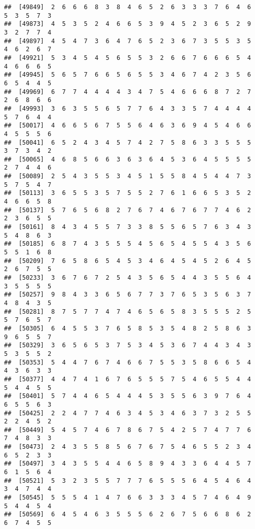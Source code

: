 \documentclass[
]{book}
\begin{document}
\begin{verbatim}
##  [49849]  2  6  6  6  8  3  8  4  6  5  2  6  3  3  3  7  6  4  6  5  3  5  7  3
##  [49873]  4  5  3  5  2  4  6  6  5  3  9  4  5  2  3  6  5  2  9  3  2  7  7  4
##  [49897]  4  5  4  7  3  6  4  7  6  5  2  3  6  7  3  5  5  3  5  4  6  2  6  7
##  [49921]  5  3  4  5  4  5  6  5  5  3  2  6  6  7  6  6  6  5  4  4  6  6  6  5
##  [49945]  5  6  5  7  6  6  5  6  5  5  3  4  6  7  4  2  3  5  6  6  5  4  4  5
##  [49969]  6  7  7  4  4  4  4  3  4  7  5  4  6  6  6  8  7  2  7  2  6  8  6  6
##  [49993]  3  6  3  5  5  6  5  7  7  6  4  3  3  5  7  4  4  4  4  5  7  6  4  4
##  [50017]  4  6  6  5  6  7  5  5  6  4  6  3  6  9  4  5  4  6  6  4  5  5  5  6
##  [50041]  6  5  2  4  3  4  5  7  4  2  7  5  8  6  3  3  5  5  5  3  7  3  4  2
##  [50065]  4  6  8  5  6  6  3  6  3  6  4  5  3  6  4  5  5  5  5  2  7  4  4  6
##  [50089]  2  5  4  3  5  5  3  4  5  1  5  5  8  4  5  4  4  7  3  5  7  5  4  7
##  [50113]  3  6  5  5  3  5  7  5  5  2  7  6  1  6  6  5  3  5  2  4  6  6  5  8
##  [50137]  5  7  6  5  6  8  2  7  6  7  4  6  7  6  7  7  4  6  2  2  3  6  5  5
##  [50161]  8  4  3  4  5  5  7  3  3  8  5  5  6  5  7  6  3  4  3  5  4  8  6  3
##  [50185]  6  8  7  4  3  5  5  5  4  5  6  5  4  5  5  4  3  5  6  5  5  1  6  8
##  [50209]  7  6  5  8  6  5  4  5  3  4  6  4  5  4  5  2  6  4  5  2  6  7  5  5
##  [50233]  3  6  7  6  7  2  5  4  3  5  6  5  4  4  3  5  5  6  4  3  5  5  5  5
##  [50257]  9  8  4  3  3  6  5  6  7  7  3  7  6  5  3  5  6  3  7  4  8  4  3  5
##  [50281]  8  7  5  7  7  4  7  4  6  5  6  5  8  3  5  5  5  2  5  5  7  6  5  7
##  [50305]  6  4  5  5  3  7  6  5  8  5  3  5  4  8  2  5  8  6  3  9  6  5  5  7
##  [50329]  3  6  5  6  5  3  7  5  3  4  5  3  6  7  4  4  3  4  3  5  3  5  5  2
##  [50353]  5  4  4  7  6  7  4  6  6  7  5  5  3  5  8  6  6  5  4  4  3  6  3  3
##  [50377]  4  4  7  4  1  6  7  6  5  5  5  7  5  4  6  5  5  4  4  5  4  4  5  5
##  [50401]  5  7  4  4  6  5  4  4  4  5  3  5  5  6  3  9  7  6  4  6  5  5  6  3
##  [50425]  2  2  4  7  7  4  6  3  4  5  3  4  6  3  7  3  2  5  5  2  2  4  5  2
##  [50449]  5  4  5  7  4  6  7  8  6  7  5  4  2  5  7  4  7  7  6  7  4  8  3  3
##  [50473]  2  4  3  5  5  8  5  6  7  6  7  5  4  6  5  5  2  3  4  6  5  2  3  3
##  [50497]  3  4  3  5  5  4  4  6  5  8  9  4  3  3  6  4  4  5  7  6  1  5  6  4
##  [50521]  5  3  2  3  5  5  7  7  7  6  5  5  5  6  4  5  4  6  4  3  4  7  4  4
##  [50545]  5  5  5  4  1  4  7  6  6  3  3  3  4  5  7  4  6  4  9  5  4  4  5  4
##  [50569]  6  4  5  4  6  3  5  5  5  6  2  6  7  5  6  6  8  6  2  6  7  4  5  5

\end{verbatim}
\end{document}
